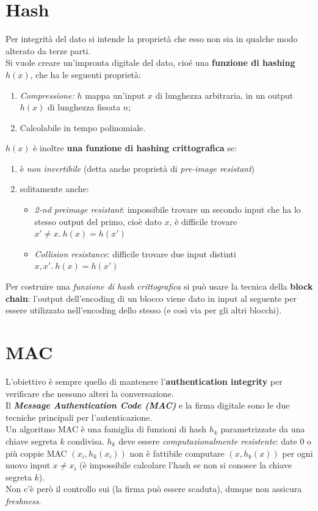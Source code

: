 \documentclass[11pt, a4paper, twoside, italian]{report}
\theoremstyle{plain}
\begin{document}
\section*{Hash}
Per integrità del dato si intende la proprietà che esso non sia in qualche modo alterato da terze parti.\\
Si vuole creare un'impronta digitale del dato, cioé una \textbf{funzione di hashing $h(x)$}, che ha le seguenti proprietà:
\begin{enumerate}
	\item \textit{Compressione:} $h$ mappa un'input $x$ di lunghezza arbitraria, in un output $h(x)$ di lunghezza fissata $n$;
	\item Calcolabile in tempo polinomiale.
\end{enumerate}
$h(x)$ è inoltre \textbf{una funzione di hashing crittografica} se:
\begin{enumerate}
	\item è \textit{non invertibile} (detta anche proprietà di \textit{pre-image resistant})
	\item solitamente anche:
	\begin{itemize}
		\item \textit{2-nd preimage resistant}: impossibile trovare un secondo input che ha lo stesso output del primo, cioè dato $x$, è difficile trovare $x'\neq x.\  h(x)=h(x')$ 
		\item \textit{Collision resistance}: difficile trovare due input distinti $x, x'.\ h(x)=h(x')$ 
	\end{itemize}
\end{enumerate}
\noindent
Per costruire una \textit{funzione di hash crittografica} si può usare la tecnica della \textbf{block chain}: l'output dell'encoding di un blocco viene dato in input al seguente per essere utilizzato nell'encoding dello stesso (e così via per gli altri blocchi).


\section*{MAC}
L'obiettivo è sempre quello di mantenere l'\textbf{authentication integrity} per verificare che nessuno alteri la conversazione.\\
Il \textit{\textbf{Message Authentication Code (MAC)}} e la firma digitale sono le due tecniche principali per l'autenticazione.\\
Un algoritmo MAC è una famiglia di funzioni di hash $h_{k}$ parametrizzate da una chiave segreta $k$ condivisa. 
$h_{k}$ deve essere \textit{computazionalmente resistente}: date $0$ o più coppie MAC $(x_{i}, h_{k}(x_{i}))$ non è fattibile computare $(x, h_{k}(x))$ per ogni nuovo input $x \neq x_{i}$ (è impossibile calcolare l'hash se non si conosce la chiave segreta $k$).\\
Non c'è però il controllo sui  (la firma può essere scaduta), dunque non assicura \textit{freshness}.
\end{document}
